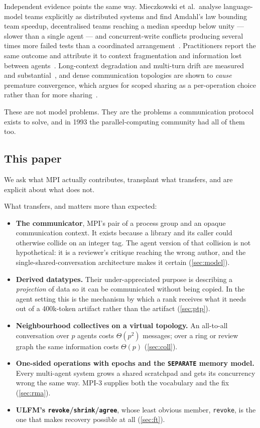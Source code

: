 \documentclass[10pt,twocolumn]{article}
\theoremstyle{definition}
\theoremstyle{plain}
\newcommand{\code}[1]{\texttt{\small #1}}
\begin{document}
Independent evidence points the same way. Mieczkowski et al.\ analyse language-model
teams explicitly as distributed systems and find Amdahl's law bounding team
speedup, decentralised teams reaching a median speedup below unity --- slower than a
single agent --- and concurrent-write conflicts producing several times more failed
tests than a coordinated arrangement~\cite{lmteams26}. Practitioners report the same
outcome and attribute it to context fragmentation and information lost between
agents~\cite{cognitiondont,anthropicmas}. Long-context degradation and multi-turn
drift are measured and substantial~\cite{liu24lostinmiddle,labanlost,chromarot},
and dense communication topologies are shown to \emph{cause} premature convergence,
which argues for scoped sharing as a per-operation choice rather than for more
sharing~\cite{diversitycollapse}.

These are not model problems. They are the problems a communication protocol exists
to solve, and in 1993 the parallel-computing community had all of them too.

\subsection{This paper}

We ask what MPI actually contributes, transplant what transfers, and are explicit
about what does not.

What transfers, and matters more than expected:
\begin{itemize}\itemsep2pt
\item \textbf{The communicator}, MPI's pair of a process group and an opaque
communication context. It exists because a library and its caller could otherwise
collide on an integer tag. The agent version of that collision is not
hypothetical: it is a reviewer's critique reaching the wrong author, and the
single-shared-conversation architecture makes it certain (\cref{sec:model}).
\item \textbf{Derived datatypes.} Their under-appreciated purpose is describing a
\emph{projection} of data so it can be communicated without being copied. In the
agent setting this is the mechanism by which a rank receives what it needs out of
a 400k-token artifact rather than the artifact (\cref{sec:ptp}).
\item \textbf{Neighbourhood collectives on a virtual topology.} An all-to-all
conversation over $p$ agents costs $\Theta(p^2)$ messages; over a ring or review
graph the same information costs $\Theta(p)$ (\cref{sec:coll}).
\item \textbf{One-sided operations with epochs and the \code{SEPARATE} memory
model.} Every multi-agent system grows a shared scratchpad and gets its
concurrency wrong the same way. MPI-3 supplies both the vocabulary and the fix
(\cref{sec:rma}).
\item \textbf{ULFM's \code{revoke}/\code{shrink}/\code{agree}}, whose least
obvious member, \code{revoke}, is the one that makes recovery possible at all
(\cref{sec:ft}).
\end{itemize}
\end{document}

